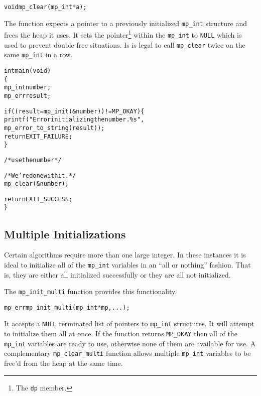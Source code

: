 \documentclass[synpaper]{book}
\begin{document}
\begin{alltt}
void mp_clear (mp_int *a);
\end{alltt}

The function expects a pointer to a previously initialized \texttt{mp\_int} structure and frees the heap it uses.  It sets the
pointer\footnote{The \texttt{dp} member.} within the \texttt{mp\_int} to \texttt{NULL} which is used to prevent double free situations.
Is is legal to call \texttt{mp\_clear} twice on the same \texttt{mp\_int} in a row.

\begin{small}
\begin{alltt}
int main(void)
\{
   mp_int number;
   mp_err result;

   if ((result = mp_init(&number)) != MP_OKAY) \{
      printf("Error initializing the number.  \%s",
             mp_error_to_string(result));
      return EXIT_FAILURE;
   \}

   /* use the number */

   /* We're done with it. */
   mp_clear(&number);

   return EXIT_SUCCESS;
\}
\end{alltt}
\end{small}

\subsection{Multiple Initializations}
Certain algorithms require more than one large integer.  In these instances it is ideal to initialize all of the \texttt{mp\_int}
variables in an ``all or nothing'' fashion.  That is, they are either all initialized successfully or they are all
not initialized.

The  \texttt{mp\_init\_multi} function provides this functionality.

 
\begin{alltt}
mp_err mp_init_multi(mp_int *mp, ...);
\end{alltt}

It accepts a \texttt{NULL} terminated list of pointers to \texttt{mp\_int} structures.  It will attempt to initialize them all
at once.  If the function returns \texttt{MP\_OKAY} then all of the \texttt{mp\_int} variables are ready to use, otherwise none of them
are available for use.  A complementary \texttt{mp\_clear\_multi} function allows multiple \texttt{mp\_int} variables to be free'd
from the heap at the same time.
\end{document}

